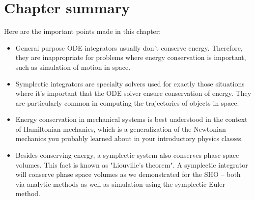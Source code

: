 \documentclass[hidelinks,notitlepage]{book}
\begin{document}
\section{Chapter summary}
Here are the important points made in this chapter:
\begin{itemize}
	\item General purpose ODE integrators usually don't conserve energy.  Therefore, they are inappropriate for problems where energy conservation is important, such as simulation of motion in space.
	\item Symplectic integrators are specialty solvers used for exactly those situations where it's important that the ODE solver ensure conservation of energy.  They are particularly common in computing the trajectories of objects in space.
	\item Energy conservation in mechanical systems is best understood in the context of Hamiltonian mechanics, which is a generalization of the Newtonian mechanics you probably learned about in your introductory physics classes.  
	\item Besides conserving energy, a symplectic system also conserves phase space volumes.  This fact is known as "Liouville's theorem".  A symplectic integrator will conserve phase space volumes as we demonstrated for the SHO -- both via analytic methods as well as simulation using the symplectic Euler method.
\end{itemize}
\end{document}
